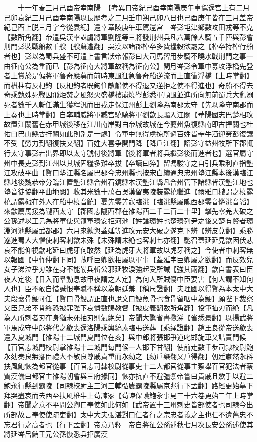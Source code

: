 　　十一年春三月己酉帝幸南陽　【考異曰帝紀己酉幸南陽庚午車駕還宫上有二月己卯袁紀三月己酉幸南陽以長歷考之二月壬申朔己卯八日也己酉庚午皆在三月盖帝紀己酉上脱三月字今從袁紀】還幸章陵庚午車駕還宫　岑彭屯津鄉數攻田戎等不克【數所角翻】帝遣吳漢率誅虜將軍劉隆等三將發荆州兵凡六萬餘人騎五千匹與彭會荆門彭裝戰船數千艘【艘蘇遭翻】吳漢以諸郡棹卒多費糧穀欲罷之【棹卒持棹行船者也】彭以為蜀兵盛不可遣上書言狀帝報彭曰大司馬習用步騎不曉水戰荆門之事一由征南公為重而已【彭為征南大將軍故稱為征南公】閏月岑彭令軍中募攻浮橋先登者上賞於是偏將軍魯奇應募而前時東風狂急魯奇船逆流而上直衝浮橋【上時掌翻】而櫕柱有反杷鉤【反杷鉤者既鉤住敵船使不得退又逆拒之使不得進也】奇船不得去奇乘埶殊死戰因飛炬焚之風怒火盛橋樓崩燒岑彭悉軍順風並進所向無前蜀兵大亂溺死者數千人斬任滿生獲程汎而田戎走保江州彭上劉隆為南郡太守【先以隆守南郡而上奏也上時掌翻】自率輔威將軍臧宫驍騎將軍劉歆長驅入江關【華陽國志巴楚相攻故置江關舊在赤甲城後移在江川南岸對白帝城故城在今夔州魚復縣南即古捍關也杜佑曰巴山縣古扞關如此則别是一處】令軍中無得虜掠所過百姓皆奉牛酒迎勞彭復讓不受【勞力到翻復扶又翻】百姓大喜争開門降【降戶江翻】詔彭守益州牧所下郡輒行太守事彭若出界即以太守號付後將軍【後將軍者將兵繼彭後而進者也】選官屬守州中長吏彭到江州以其城固糧多難卒拔【卒讀曰猝】留馮駿守之自引兵乘利直指墊江攻破平曲【賢曰墊江縣名屬巴郡今忠州縣也按宋白續通典忠州墊江縣本後漢臨江縣地後魏恭帝分臨江置墊江縣合州石鏡縣本漢墊江縣凡合州管下諸縣皆漢墊江地也墊音徒協翻平曲地闕】收其米數十萬石吳漢留夷陵裝露橈繼進【爾雅曰檝謂之橈露橈謂露檝在外人在船中橈音饒】夏先零羌寇臨洮【臨洮縣屬隴西郡零音憐洮音韜】來歙薦馬援為隴西太守【郡國志隴西郡在雒陽西二千二百二十里】擊先零羌大破之　公孫述以王元為將軍使與領軍環安拒河池【姓譜環姓也楚環列尹之後又楚有賢者環淵河池縣屬武都郡】六月來歙與蓋延等進攻元安大破之遂克下辨【辨皮莧翻】乘勝遂進蜀人大懼使刺客刺歙未殊【未殊謂未絶也客刺七亦翻】馳召蓋延延見歙因伏悲哀不能仰視歙叱延曰虎牙何敢然【延為虎牙大將軍故以虎牙稱之】今使者中刺客無以報國【中竹仲翻下同】故呼巨卿欲相屬以軍事【蓋延字巨卿屬之欲翻】而反效兒女子涕泣乎刃雖在身不能勒兵斬公邪延牧淚強起受所誡【強其兩翻】歙自書表曰臣夜人定後【日入而羣動息故甲夜謂之人定】為何人所賊傷中臣要害【何人謂不知何人也】臣不敢自惜誠恨奉職不稱以為朝廷羞【稱尺證翻】夫理國以得賢為本太中大夫段襄骨鯁可任【賢曰骨鯁謂正直也說文曰鯁魚骨也食骨留咽中為鯁】願陛下裁察又臣兄弟不肖終恐被罪陛下哀憐數賜教督【被皮義翻數所角翻】投筆抽刃而絶【凡為人所刺者刃在身猶未死抽刃則氣絶矣】帝聞大驚省書攬涕【省悉景翻】以揚武將軍馬成守中郎將代之歙喪還洛陽乘輿縞素臨弔送葬【乘䋲證翻】趙王良從帝送歙喪還入夏城門【雒陽十二城門夏門位在亥】與中郎將張邯爭道叱邯旋車又詰責門候【百官志城門校尉掌雒陽十二城門每門候一人邯下甘翻】使前走數千步司隸校尉鮑永劾奏良無藩臣禮大不敬良尊戚貴重而永劾之【劾戶槩翻又戶得翻】朝廷肅然永辟扶風鮑恢為都官從事【百官志司隸校尉從事吏十二人都官從事主察舉百官犯法者蔡質漢儀曰都官主雒陽朝會與三府掾同】恢亦抗直不避彊禦帝嘗曰貴戚且歛手以避二鮑永行縣到霸陵【司隸校尉主三河三輔弘農霸陵縣屬京兆行下孟翻】路經更始墓下拜哭盡哀而去西至扶風椎牛上苟諫冢【苟諫保護鮑永事見三十六卷更始二年上時掌翻】帝聞之意不平問公卿曰奉使如此何如【武帝置十三州刺史皆部使者也司隸今出所部故言奉使使疏吏翻】太中大夫張湛對曰仁者行之宗忠者義之主也仁不遺舊忠不忘君行之高者也【行下孟翻】帝意乃釋　帝自將征公孫述秋七月次長安公孫述使其將延岑呂鮪王元公孫恢悉兵拒廣漢

